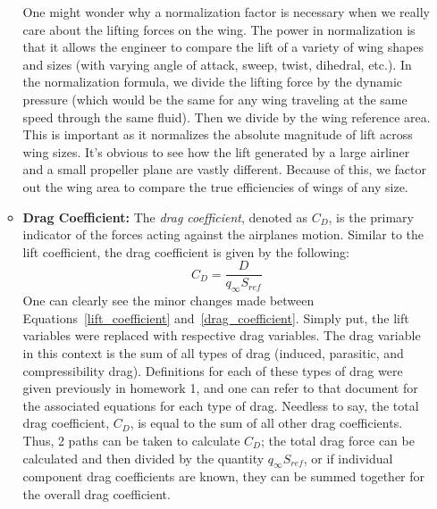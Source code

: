 \documentclass{article}
\begin{document}
\begin{itemize}
\begin{itemize}
        One might wonder why a normalization factor is necessary when we really care about the lifting forces on the wing. The power in normalization is that it allows the engineer to compare the lift of a variety of wing shapes and sizes (with varying angle of attack, sweep, twist, dihedral, etc.). In the normalization formula, we divide the lifting force by the dynamic pressure (which would be the same for any wing traveling at the same speed through the same fluid).
        Then we divide by the wing reference area. This is important as it normalizes the absolute magnitude of lift across wing sizes. It's obvious to see how the lift generated by a large airliner and a small propeller plane are vastly different.
        Because of this, we factor out the wing area to compare the true efficiencies of wings of any size.
        \item[] \textbf{Drag Coefficient:} The \textit{drag coefficient}, denoted as $C_D$, is the primary indicator of the forces acting against the airplanes motion.
        Similar to the lift coefficient, the drag coefficient is given by the following:
        \begin{equation}
            C_D = \frac{D}{q_{\infty} S_{ref}}\label{drag_coefficient}
        \end{equation}
        One can clearly see the minor changes made between Equations~\eqref{lift_coefficient} and~\eqref{drag_coefficient}. Simply put, the lift variables were replaced with respective drag variables.
        The drag variable in this context is the sum of all types of drag (induced, parasitic, and compressibility drag). Definitions for each of these types of drag were given previously in homework 1, and one can refer to that document for the associated equations for each type of drag.
        Needless to say, the total drag coefficient, $C_D$, is equal to the sum of all other drag coefficients. Thus, 2 paths can be taken to calculate $C_D$; the total drag force can be calculated and then divided by the quantity $q_{\infty} S_{ref}$, or if individual component drag coefficients are known, they can be summed together for the overall drag coefficient.
        

\end{itemize}
\end{itemize}
\end{document}
